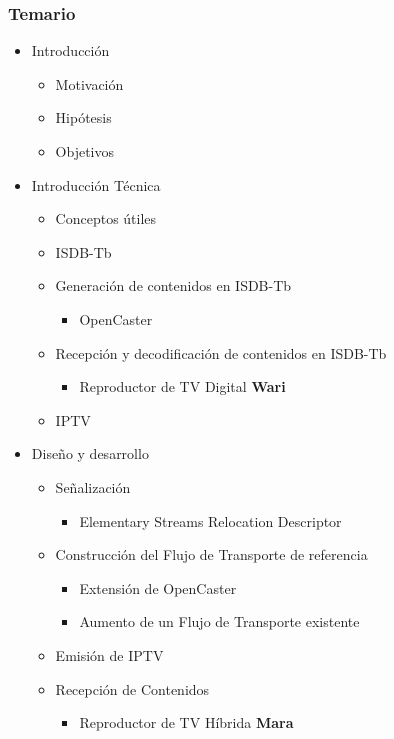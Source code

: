 \documentclass[a4paper,11pt]{beamer}
\begin{document}
\begin{frame}
\frametitle{Temario}
\begin{center}
\begin{itemize}
\item Introducción
	\begin{itemize}
		\item Motivación
		\item Hipótesis
		\item Objetivos
	\end{itemize}
\item Introducción Técnica
	\begin{itemize}
		\item Conceptos útiles
		\item ISDB-Tb
		\item Generación de contenidos en ISDB-Tb
		\begin{itemize}
			\item OpenCaster
		\end{itemize}
		\item Recepción y decodificación de contenidos en ISDB-Tb
		\begin{itemize}
			\item Reproductor de TV Digital \textbf{Wari}
		\end{itemize}
		\item IPTV
	\end{itemize}
\item Diseño y desarrollo
	\begin{itemize}
		\item Señalización
			\begin{itemize}
				\item Elementary Streams Relocation Descriptor
			\end{itemize}
		\item Construcción del Flujo de Transporte de referencia
			\begin{itemize}
				\item Extensión de OpenCaster
				\item Aumento de un Flujo de Transporte existente
			\end{itemize}
		\item Emisión de IPTV
		\item Recepción de Contenidos
			\begin{itemize}
				\item Reproductor de TV Híbrida \textbf{Mara}
			\end{itemize}
	\end{itemize}

\end{itemize}
\end{center}
\end{frame}
\end{document}
